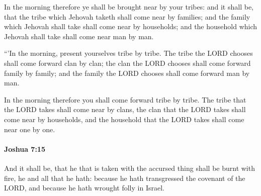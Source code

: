 			\begin{versebox}
					\item[BHS] 
					\item[ASV] In the morning therefore ye shall be brought near by your tribes: and it shall be, that the tribe which Jehovah taketh shall come near by families; and the family which Jehovah shall take shall come near by households; and the household which Jehovah shall take shall come near man by man.
					\item[NIV] “’In the morning, present yourselves tribe by tribe. The tribe the LORD chooses shall come forward clan by clan; the clan the LORD chooses shall come forward family by family; and the family the LORD chooses shall come forward man by man.
					\item[NRSV] In the morning therefore you shall come forward tribe by tribe. The tribe that the LORD takes shall come near by clans, the clan that the LORD takes shall come near by households, and the household that the LORD takes shall come near one by one.
			\end{versebox}

		\paragraph{Joshua 7:15} %
			\label{JOSHUA-7-15}

			And it shall be, that he that is taken with the accursed thing shall be burnt with fire, he and all that he hath: because he hath transgressed the covenant of the LORD, and because he hath wrought folly in Israel.

